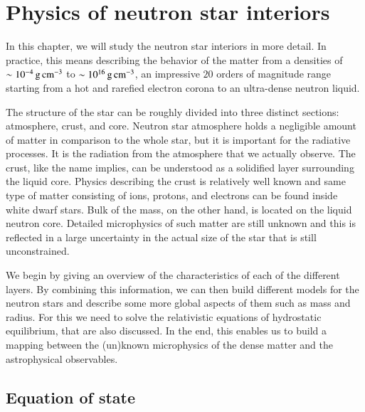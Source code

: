 \chapter{Physics of neutron star interiors} 
In this chapter, we will study the neutron star interiors in more detail.
In practice, this means describing the behavior of the matter from a densities of $\sim 10^{-4} \, \mathrm{g}\,\mathrm{cm}^{-3}$ to $\sim 10^{16} \, \mathrm{g}\,\mathrm{cm}^{-3}$, an impressive $20$ orders of magnitude range starting from a hot and rarefied electron corona to an ultra-dense neutron liquid.

The structure of the star can be roughly divided into three distinct sections: atmosphere, crust, and core.
Neutron star atmosphere holds a negligible amount of matter in comparison to the whole star, but it is important for the radiative processes.
It is the radiation from the atmosphere that we actually observe.
The crust, like the name implies, can be understood as a solidified layer surrounding the liquid core.
Physics describing the crust is relatively well known and same type of matter consisting of ions, protons, and electrons can be found inside white dwarf stars.
Bulk of the mass, on the other hand, is located on the liquid neutron core.
Detailed microphysics of such matter are still unknown and this is reflected in a large uncertainty in the actual size of the star that is still unconstrained.

We begin by giving an overview of the characteristics of each of the different layers.
By combining this information, we can then build different models for the neutron stars and describe some more global aspects of them such as mass and radius.
For this we need to solve the relativistic equations of hydrostatic equilibrium, that are also discussed.
In the end, this enables us to build a mapping between the (un)known microphysics of the dense matter and the astrophysical observables.


\section{Equation of state}
%
%
%
%

